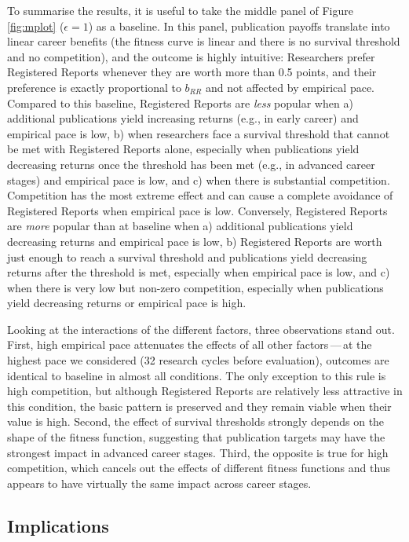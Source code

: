\documentclass[
  ,man,mask,floatsintext]{apa6}
\begin{document}
To summarise the results, it is useful to take
the middle panel of Figure \ref{fig:mplot} (\(\epsilon = 1\)) as a baseline.
In this panel, publication payoffs translate into linear career benefits (the fitness curve is linear and there is no survival threshold and no competition), and the outcome is highly intuitive:
Researchers prefer Registered Reports whenever they are worth more than 0.5 points, and their preference is exactly proportional to \(b_{RR}\) and not affected by empirical pace.
Compared to this baseline, Registered Reports are \emph{less} popular when a) additional publications yield increasing returns (e.g., in early career) and empirical pace is low, b) when researchers face a survival threshold that cannot be met with Registered Reports alone, especially when publications yield decreasing returns once the threshold has been met (e.g., in advanced career stages) and empirical pace is low, and c) when there is substantial competition.
Competition has the most extreme effect and can cause a complete avoidance of Registered Reports when empirical pace is low.
Conversely, Registered Reports are \emph{more} popular than at baseline when a) additional publications yield decreasing returns and empirical pace is low, b) Registered Reports are worth just enough to reach a survival threshold and publications yield decreasing returns after the threshold is met, especially when empirical pace is low, and c) when there is very low but non-zero competition, especially when publications yield decreasing returns or empirical pace is high.

Looking at the interactions of the different factors, three observations stand out.
First, high empirical pace attenuates the effects of all other factors\(\,\)---\(\,\)at the highest pace we considered (32 research cycles before evaluation), outcomes are identical to baseline in almost all conditions.
The only exception to this rule is high competition, but although Registered Reports are relatively less attractive in this condition, the basic pattern is preserved and they remain viable when their value is high.
Second, the effect of survival thresholds strongly depends on the shape of the fitness function, suggesting that publication targets may have the strongest impact in advanced career stages.
Third, the opposite is true for high competition, which cancels out the effects of different fitness functions and thus appears to have virtually the same impact across career stages.

\hypertarget{implications}{%
\subsection{Implications}\label{implications}}
\end{document}
